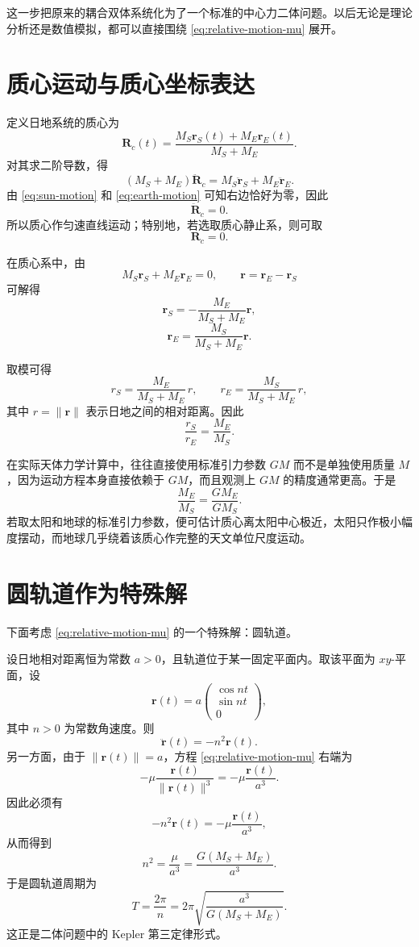 \documentclass[12pt,a4paper]{ctexrep}
\begin{document}
这一步把原来的耦合双体系统化为了一个标准的中心力二体问题。以后无论是理论分析还是数值模拟，都可以直接围绕 \eqref{eq:relative-motion-mu} 展开。

\section{质心运动与质心坐标表达}

定义日地系统的质心为
\[
\bm R_c(t)=\frac{M_S\bm r_S(t)+M_E\bm r_E(t)}{M_S+M_E}.
\]
对其求二阶导数，得
\[
(M_S+M_E)\ddot{\bm R}_c=M_S\ddot{\bm r}_S+M_E\ddot{\bm r}_E.
\]
由 \eqref{eq:sun-motion} 和 \eqref{eq:earth-motion} 可知右边恰好为零，因此
\[
\ddot{\bm R}_c=0.
\]
所以质心作匀速直线运动；特别地，若选取质心静止系，则可取
\[
\bm R_c=0.
\]

在质心系中，由
\[
M_S \bm r_S + M_E \bm r_E = 0,
\qquad
\bm r = \bm r_E-\bm r_S
\]
可解得
\begin{equation}\label{eq:rs-bary}
\bm r_S=-\frac{M_E}{M_S+M_E}\bm r,
\end{equation}
\begin{equation}\label{eq:re-bary}
\bm r_E=\frac{M_S}{M_S+M_E}\bm r.
\end{equation}

取模可得
\[
r_S=\frac{M_E}{M_S+M_E}\,r,
\qquad
r_E=\frac{M_S}{M_S+M_E}\,r,
\]
其中 \(r=\|\bm r\|\) 表示日地之间的相对距离。因此
\[
\frac{r_S}{r_E}=\frac{M_E}{M_S}.
\]

在实际天体力学计算中，往往直接使用标准引力参数 \(GM\) 而不是单独使用质量 \(M\)，因为运动方程本身直接依赖于 \(GM\)，而且观测上 \(GM\) 的精度通常更高。于是
\[
\frac{M_E}{M_S}=\frac{GM_E}{GM_S}.
\]
若取太阳和地球的标准引力参数，便可估计质心离太阳中心极近，太阳只作极小幅度摆动，而地球几乎绕着该质心作完整的天文单位尺度运动。

\section{圆轨道作为特殊解}

下面考虑 \eqref{eq:relative-motion-mu} 的一个特殊解：圆轨道。

设日地相对距离恒为常数 \(a>0\)，且轨道位于某一固定平面内。取该平面为 \(xy\)-平面，设
\begin{equation}\label{eq:circular-ansatz}
\bm r(t)
=
a
\begin{pmatrix}
\cos nt\\
\sin nt\\
0
\end{pmatrix},
\end{equation}
其中 \(n>0\) 为常数角速度。则
\[
\ddot{\bm r}(t)=-n^2\bm r(t).
\]
另一方面，由于 \(\|\bm r(t)\|=a\)，方程 \eqref{eq:relative-motion-mu} 右端为
\[
-\mu \frac{\bm r(t)}{\|\bm r(t)\|^3}=-\mu \frac{\bm r(t)}{a^3}.
\]
因此必须有
\[
-n^2\bm r(t)=-\mu \frac{\bm r(t)}{a^3},
\]
从而得到
\begin{equation}\label{eq:n2}
n^2=\frac{\mu}{a^3}=\frac{G(M_S+M_E)}{a^3}.
\end{equation}
于是圆轨道周期为
\begin{equation}\label{eq:period}
T=\frac{2\pi}{n}=2\pi \sqrt{\frac{a^3}{G(M_S+M_E)}}.
\end{equation}
这正是二体问题中的 Kepler 第三定律形式。
\end{document}
